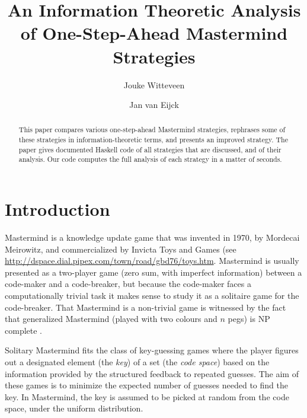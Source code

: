 \documentclass[a4paper]{article}
\title{An Information Theoretic Analysis of One-Step-Ahead Mastermind Strategies}
\author{Jouke Witteveen \and Jan van Eijck}
\theoremstyle{definition}
\begin{document}
\maketitle


\begin{abstract}
\noindent
This paper compares various one-step-ahead Mastermind strategies, rephrases some of these strategies in information-theoretic terms, and presents an improved strategy.
The paper gives documented Haskell code of all strategies that are discussed, and of their analysis.
Our code computes the full analysis of each strategy in a matter of seconds.
\end{abstract}


\section*{Introduction}

Mastermind is a knowledge update game that was invented in 1970, by Mordecai Meirowitz, and commercialized by Invicta Toys and Games (see \url{http://dspace.dial.pipex.com/town/road/gbd76/toys.htm}.
Mastermind is usually presented as a two-player game (zero sum, with imperfect information) between a code-maker and a code-breaker, but because the code-maker faces a computationally trivial task it makes sense to study it as a solitaire game for the code-breaker.
That Mastermind is a non-trivial game is witnessed by the fact that generalized Mastermind (played with two colours and $n$ pegs) is NP complete \citep{Bondt2004:npcomm}.

Solitary Mastermind fits the class of key-guessing games where the player figures out a designated element (the \emph{key}) of a set (the \emph{code space}) based on the information provided by the structured feedback to repeated guesses.
The aim of these games is to minimize the expected number of guesses needed to find the key.
In Mastermind, the key is assumed to be picked at random from the code space, under the uniform distribution.
\end{document}
